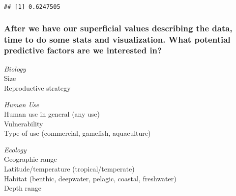 \documentclass[]{article}
\begin{document}
\begin{verbatim}
## [1] 0.6247505
\end{verbatim}

\subsubsection{After we have our superficial values describing the data,
time to do some stats and visualization. What potential predictive
factors are we interested
in?}\label{after-we-have-our-superficial-values-describing-the-data-time-to-do-some-stats-and-visualization.-what-potential-predictive-factors-are-we-interested-in}

\emph{Biology}\\
Size\\
Reproductive strategy

\emph{Human Use}\\
Human use in general (any use)\\
Vulnerability\\
Type of use (commercial, gamefish, aquaculture)

\emph{Ecology}\\
Geographic range\\
Latitude/temperature (tropical/temperate)\\
Habitat (benthic, deepwater, pelagic, coastal, freshwater)\\
Depth range
\end{document}
